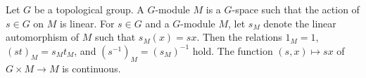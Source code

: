 Let $G$ be a topological group. A $G$-module $M$ is a $G$-space such that the action of $s \in G$ on $M$ is linear. For $s \in G$ and a $G$-module $M$, let $s_M$ denote the linear automorphism of $M$ such that $s_M(x) = sx$. Then the relations $1_M = 1$, $(st)_M = s_M t_M$, and $(s^{-1})_M = (s_M)^{-1}$ hold. The function $(s, x) \mapsto sx$ of $G \times M \to M$ is continuous.

